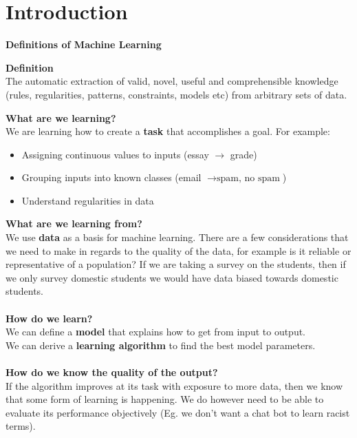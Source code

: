 \documentclass[a4paper,10pt]{article}
\begin{document}
\section*{Introduction}
\textcolor{Periwinkle}{\textbf{Definitions of Machine Learning}} 
\begin{shaded}
\noindent \textbf{Definition} \\
The automatic extraction of valid, novel, useful and comprehensible knowledge (rules, regularities, patterns, constraints, models etc) from arbitrary sets of data.
\end{shaded}
\noindent \textbf{What are we learning?} \\
We are learning how to create a \textcolor{Periwinkle}{\textbf{task}} that accomplishes a goal. For example: 
\begin{itemize}
	\item Assigning continuous values to inputs (essay $\rightarrow$ grade)
	\item Grouping inputs into known classes (email $\rightarrow {\text{spam, no spam}}$)
	\item Understand regularities in data \\
\end{itemize}
\noindent \textbf{What are we learning from?}\\
We use \textcolor{Periwinkle}{\textbf{data}} as a basis for machine learning. There are a few considerations that we need to make in regards to the quality of the data, for example is it reliable or representative of a population? If we are taking a survey on the students, then if we only survey domestic students we would have data biased towards domestic students. \\\\
\noindent \textbf{How do we learn?}\\
We can define a \textcolor{Periwinkle}{\textbf{model}} that explains how to get from input to output. \\
We can derive a \textcolor{Periwinkle}{\textbf{learning algorithm}} to find the best model parameters. \\\\
\noindent \textbf{How do we know the quality of the output?}\\
If the algorithm improves at its task with exposure to more data, then we know that some form of learning is happening. We do however need to be able to evaluate its performance objectively (Eg. we don't want a chat bot to learn racist terms). \\\\
\end{document}
